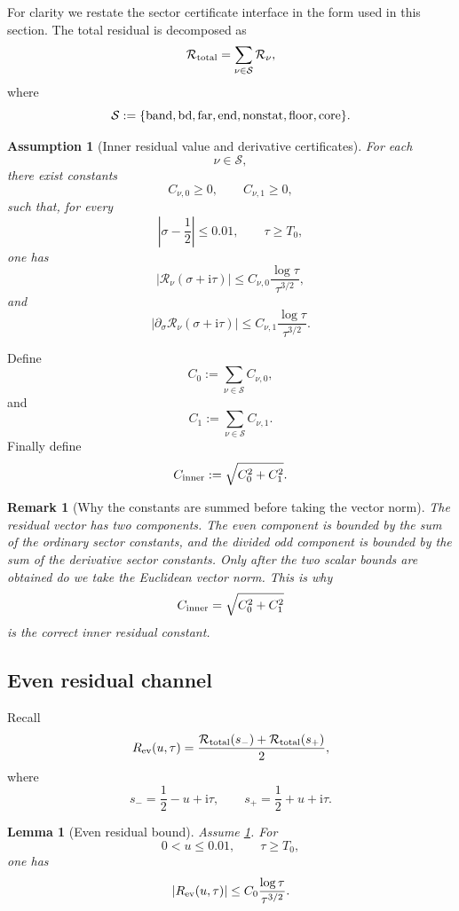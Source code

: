 \documentclass[11pt]{article}
\newtheorem{lemma}[theorem]{Lemma}
\newtheorem{remark}[theorem]{Remark}
\newtheorem{assumption}[theorem]{Assumption}
\newcommand{\ii}{\mathrm{i}}
\newcommand{\Rtot}{\mathcal R_{\rm total}}
\newcommand{\Cinner}{C_{\rm inner}}
\newcommand{\Czero}{C_0}
\newcommand{\Cone}{C_1}
\begin{document}
For clarity we restate the sector certificate interface in the form used in
this section.  The total residual is decomposed as
\[
        \Rtot
        =
        \sum_{\nu\in\mathcal S}
        \mathcal R_\nu,
\]
where
\[
        \mathcal S
        :=
        \{
        {\rm band},
        {\rm bd},
        {\rm far},
        {\rm end},
        {\rm nonstat},
        {\rm floor},
        {\rm core}
        \}.
\]

\begin{assumption}[Inner residual value and derivative certificates]
\label{ass:inner-residual-certificates}
For each
\[
        \nu\in\mathcal S,
\]
there exist constants
\[
        C_{\nu,0}\ge0,
        \qquad
        C_{\nu,1}\ge0,
\]
such that, for every
\[
        \left|\sigma-\frac12\right|\le0.01,
        \qquad
        \tau\ge T_0,
\]
one has
\[
        |\mathcal R_\nu(\sigma+\ii\tau)|
        \le
        C_{\nu,0}
        \frac{\log\tau}{\tau^{3/2}},
\]
and
\[
        |\partial_\sigma\mathcal R_\nu(\sigma+\ii\tau)|
        \le
        C_{\nu,1}
        \frac{\log\tau}{\tau^{3/2}}.
\]
\end{assumption}

Define
\[
        \Czero
        :=
        \sum_{\nu\in\mathcal S}
        C_{\nu,0},
\]
and
\[
        \Cone
        :=
        \sum_{\nu\in\mathcal S}
        C_{\nu,1}.
\]
Finally define
\[
        \Cinner
        :=
        \sqrt{\Czero^2+\Cone^2}.
\]

\begin{remark}[Why the constants are summed before taking the vector norm]
The residual vector has two components.  The even component is bounded by the
sum of the ordinary sector constants, and the divided odd component is bounded
by the sum of the derivative sector constants.  Only after the two scalar
bounds are obtained do we take the Euclidean vector norm.  This is why
\[
        \Cinner=\sqrt{\Czero^2+\Cone^2}
\]
is the correct inner residual constant.
\end{remark}

\subsection{Even residual channel}

Recall
\[
        R_{\rm ev}(u,\tau)
        =
        \frac{\Rtot(s_-)+\Rtot(s_+)}2,
\]
where
\[
        s_-=\frac12-u+\ii\tau,
        \qquad
        s_+=\frac12+u+\ii\tau.
\]

\begin{lemma}[Even residual bound]
\label{lem:even-residual-bound}
Assume \cref{ass:inner-residual-certificates}.  For
\[
        0<u\le0.01,
        \qquad
        \tau\ge T_0,
\]
one has
\[
        |R_{\rm ev}(u,\tau)|
        \le
        \Czero
        \frac{\log\tau}{\tau^{3/2}}.
\]
\end{lemma}
\end{document}
